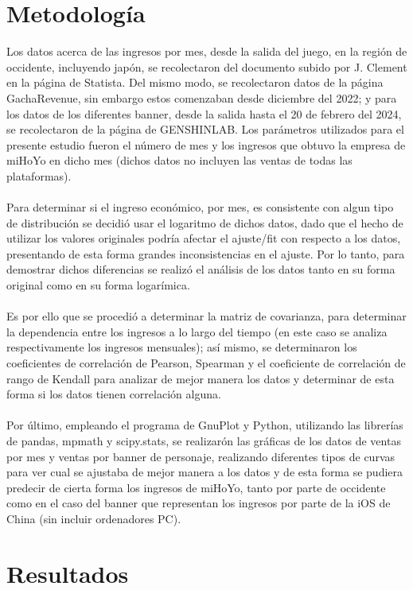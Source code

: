 \documentclass[osajnl,twocolumn,showpacs,superscriptaddress,10pt]{revtex4-2}
\begin{document}
\section{Metodología}
Los datos acerca de las ingresos por mes, desde la salida del juego, en la región de occidente, incluyendo japón, se recolectaron del documento subido por J. Clement en  la página de Statista. Del mismo modo, se recolectaron datos de la página GachaRevenue, sin embargo estos comenzaban desde diciembre del 2022; y para los datos de los diferentes banner, desde la salida hasta el 20 de febrero del 2024, se recolectaron de la página de GENSHINLAB. Los parámetros utilizados para el presente estudio fueron el número de mes y los ingresos que obtuvo la empresa de miHoYo en dicho mes (dichos datos no incluyen las ventas de todas las plataformas).
\\\\
Para determinar si el ingreso económico, por mes, es consistente con algun tipo de distribución se decidió usar el logaritmo de dichos datos, dado que el hecho de utilizar los valores originales podría afectar el ajuste/fit con respecto a los datos, presentando de esta forma grandes inconsistencias en el ajuste. Por lo tanto, para demostrar dichos diferencias se realizó el análisis de los datos tanto en su forma original como en su forma logarímica.
\\\\
Es por ello que se procedió a determinar la matriz de covarianza, para determinar la dependencia entre los ingresos a lo largo del tiempo (en este caso se analiza respectivamente los ingresos mensuales); así mismo, se determinaron los coeficientes de correlación de Pearson, Spearman y el coeficiente de correlación de rango de Kendall para analizar de mejor manera los datos y determinar de esta forma si los datos tienen correlación alguna.
\\\\
Por último, empleando el programa de GnuPlot y Python, utilizando las librerías de pandas, mpmath y scipy.stats, se realizarón las gráficas de los datos de ventas por mes y ventas por banner de personaje, realizando diferentes tipos de curvas para ver cual se ajustaba de mejor manera a los datos y de esta forma se pudiera predecir de cierta forma los ingresos de miHoYo, tanto por parte de occidente como en el caso del banner que representan los ingresos por parte de la iOS de China (sin incluir ordenadores PC).

\section{Resultados}
\end{document}
